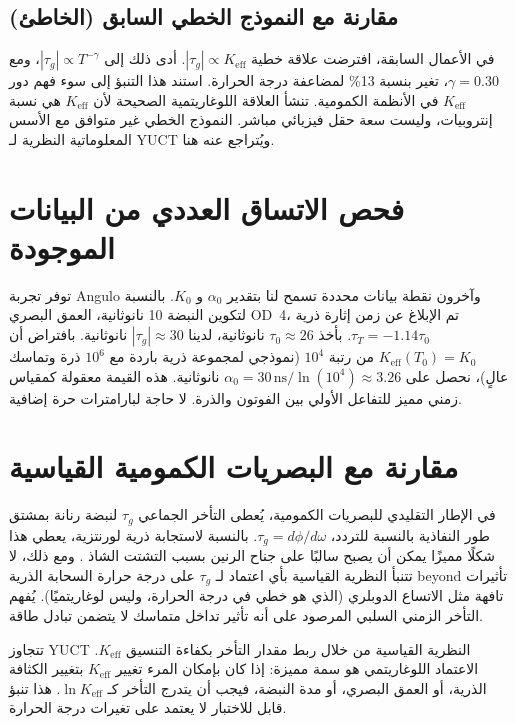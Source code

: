 \documentclass[12pt,a4paper]{article}
\newcommand{\Keff}{K_{\mathrm{eff}}}
\begin{document}
	\subsection{مقارنة مع النموذج الخطي السابق (الخاطئ)}
	
	في الأعمال السابقة، افترضت علاقة خطية \(|\tau_g| \propto \Keff\). أدى ذلك إلى \(|\tau_g| \propto T^{-\gamma}\)، ومع \(\gamma = 0.30\)، تغير بنسبة 13\% لمضاعفة درجة الحرارة. استند هذا التنبؤ إلى سوء فهم دور \(\Keff\) في الأنظمة الكمومية. تنشأ العلاقة اللوغاريتمية الصحيحة لأن \(\Keff\) هي نسبة إنتروبيات، وليست سعة حقل فيزيائي مباشر. النموذج الخطي غير متوافق مع الأسس المعلوماتية النظرية لـ YUCT ويُتراجع عنه هنا.
	
	\section{فحص الاتساق العددي من البيانات الموجودة}
	
	توفر تجربة Angulo وآخرون \cite{Angulo2024} نقطة بيانات محددة تسمح لنا بتقدير \(\alpha_0\) و \(K_0\). بالنسبة لتكوين النبضة 10 نانوثانية، العمق البصري OD~4، تم الإبلاغ عن زمن إثارة ذرية \(\tau_T = -1.14 \tau_0\). بأخذ \(\tau_0 \approx 26\) نانوثانية، لدينا \(|\tau_g| \approx 30\) نانوثانية. بافتراض أن \(\Keff(T_0) = K_0\) من رتبة \(10^4\) (نموذجي لمجموعة ذرية باردة مع \(10^6\) ذرة وتماسك عالٍ)، نحصل على \(\alpha_0 = 30\,\text{ns} / \ln(10^4) \approx 3.26\) نانوثانية. هذه القيمة معقولة كمقياس زمني مميز للتفاعل الأولي بين الفوتون والذرة. لا حاجة لبارامترات حرة إضافية.
	
	\section{مقارنة مع البصريات الكمومية القياسية}
	
	في الإطار التقليدي للبصريات الكمومية، يُعطى التأخر الجماعي \(\tau_g\) لنبضة رنانة بمشتق طور النفاذية بالنسبة للتردد، \(\tau_g = d\phi/d\omega\). بالنسبة لاستجابة ذرية لورنتزية، يعطي هذا شكلًا مميزًا يمكن أن يصبح سالبًا على جناح الرنين بسبب التشتت الشاذ \cite{Milonni2004}. ومع ذلك، لا تتنبأ النظرية القياسية بأي اعتماد لـ \(\tau_g\) على درجة حرارة السحابة الذرية beyond تأثيرات تافهة مثل الاتساع الدوبلري (الذي هو خطي في درجة الحرارة، وليس لوغاريتميًا). يُفهم التأخر الزمني السلبي المرصود على أنه تأثير تداخل متماسك لا يتضمن تبادل طاقة.
	
	تتجاوز YUCT النظرية القياسية من خلال ربط مقدار التأخر بكفاءة التنسيق \(\Keff\). الاعتماد اللوغاريتمي هو سمة مميزة: إذا كان بإمكان المرء تغيير \(\Keff\) بتغيير الكثافة الذرية، أو العمق البصري، أو مدة النبضة، فيجب أن يتدرج التأخر كـ \(\ln\Keff\). هذا تنبؤ قابل للاختبار لا يعتمد على تغيرات درجة الحرارة.
	
\end{document}
